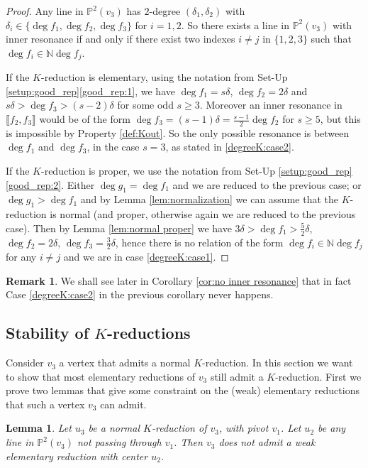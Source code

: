 \documentclass[reqno,oneside,11pt]{amsart}
\theoremstyle{plain}
\newtheorem{lemma}[theorem]{Lemma}
\theoremstyle{definition}
\newtheorem{remark}[theorem]{Remark}
\newcommand{\N}{\mathbb{N}}
\newcommand{\p}{\mathbb{P}}
\newcommand{\llb}{\llbracket}
\newcommand{\rrb}{\rrbracket}
\newcommand{\lines}[1]{\p^2(#1)}
\renewcommand{\ge}{\geqslant}
\begin{document}
\begin{proof}
Any line in $\lines{v_3}$ has $2$-degree $(\delta_1, \delta_2)$ with $\delta_i \in \{ \deg f_1, \deg f_2, \deg f_3\}$ for $i = 1,2$.
So there exists a line  in $\lines{v_3}$ with inner resonance if and only if there exist two indexes $i \neq j$ in $\{1,2,3\}$ such that $\deg f_i \in \N \deg f_j$.

If the $K$-reduction is elementary, using the notation from Set-Up
\ref{setup:good_rep}\ref{good_rep:1}, we have $\deg f_1 = s\delta$, $\deg f_2 =
2\delta$ and $s \delta > \deg f_3 > (s-2)\delta$ for some odd $s \ge 3$.
Moreover an inner resonance in $\llb f_2, f_3 \rrb$ would be of the form $\deg f_3 = (s-1) \delta = \frac{s-1}{2} \deg f_2$ for $s \ge 5$, but this is impossible by Property \ref{def:Kout}.
So the only possible resonance is between $\deg f_1$ and $\deg f_3$, in the case $s = 3$, as stated in \ref{degreeK:case2}.

If the $K$-reduction is proper, we use the notation from Set-Up
\ref{setup:good_rep}\ref{good_rep:2}.
Either $\deg g_1 = \deg f_1$ and we are reduced to the previous case; or $\deg
g_1 > \deg f_1$ and by Lemma \ref{lem:normalization} we can assume that the
$K$-reduction is normal (and proper, otherwise again we are reduced to the
previous case).
Then by Lemma \ref{lem:normal proper} we have $3\delta > \deg f_1 > \frac52 \delta$, $\deg f_2 = 2\delta$, $\deg f_3 = \frac32 \delta$, hence there is no relation of the form $\deg f_i \in \N \deg f_j$ for any $i \neq j$
and we are in case \ref{degreeK:case1}.
\end{proof}

\begin{remark}
We shall see later in Corollary \ref{cor:no inner resonance} that in fact Case \ref{degreeK:case2} in the previous corollary never happens.
\end{remark}

\subsection{Stability of $K$-reductions}

Consider $v_3$ a vertex that admits a normal $K$-reduction.
In this section we want to show that most elementary reductions of $v_3$ still admit a $K$-reduction.
First we prove two lemmas that give some constraint on the (weak) elementary reductions that such a vertex $v_3$ can admit.

\begin{lemma} \label{lem:=lemme14}
Let $u_3$ be a normal $K$-reduction of $v_3$, with pivot $v_1$.
Let $u_2$ be any line in $\lines{v_3}$ not passing through $v_1$.
Then $v_3$ does not admit a weak elementary reduction with center $u_2$.
\end{lemma}
\end{document}
